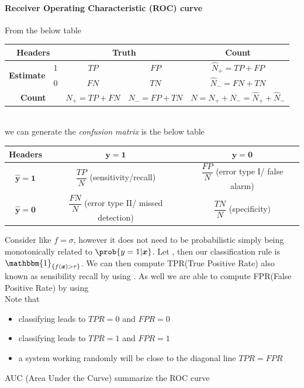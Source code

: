 \paragraph{Receiver Operating Characteristic (ROC) curve}
From the below table \\
\begin{tabular}{|cc|*{3}{c|}}
    \hline
    \multicolumn{2}{|c}{\textbf{Headers}} & \multicolumn{2}{|c|}{\textbf{Truth}} &
    \textbf{Count}\\
    \hline
    \multirow{2}{*}{\textbf{Estimate}} & 1 & $TP$ & $FP$ & $\hat{N}_{+}=TP + FP$\\
                                       & 0 & $FN$ & $TN$ & $\hat{N}_{-}=FN + TN$\\
    \hline
    \multicolumn{2}{|c|}{\textbf{Count}} & $N_{+}=TP+FN$ & $N_{-}=FP+TN$ 
                                       & $N=N_{+}+N_{-}=\hat{N}_{+}+\hat{N}_{-}$\\
    \hline
\end{tabular}\\
we can generate the \emph{confusion matrix} is the below table\\
\begin{tabular}{|*{3}{c|}}
    \hline
    \textbf{Headers} & $\bm{y=1}$ & $\bm{y=0}$\\
    \hline
    $\bm{\hat{y}=1}$ & $\dfrac{TP}{N}$ (sensitivity/recall) 
                   & $\dfrac{FP}{N}$ (error type I/ false alarm) \\
    \hline
    $\bm{\hat{y}=0}$ & $\dfrac{FN}{N}$ (error type II/ missed detection) 
                   & $\dfrac{TN}{N}$ (specificity) \\
    \hline
\end{tabular}

Consider  like $f=\sigma$, 
however it does not need to be probabilistic simply being monotonically related to 
$\prob{y=1|\bm{x}}$. Let , then our 
classification rule is 
$\mathbbm{1}_{\{f(\bm{x})> \tau\}}$. We can then compute TPR(True Positive Rate) also
known as sensibility recall by using .
As well we are able to compute FPR(False Positive Rate) by using \\
Note that 
\begin{itemize}
    \item classifying  leads to $TPR=0$ and 
        $FPR=0$
    \item classifying  leads to $TPR=1$ and 
        $FPR=1$
    \item a system working randomly will be close to the diagonal line $TPR=FPR$
\end{itemize}
AUC (Area Under the Curve) summarize the ROC curve


